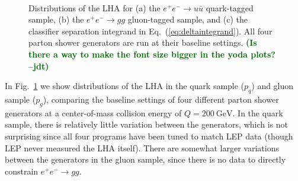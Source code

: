 \documentclass[11pt,letterpaper]{article}
\newcommand{\GeV}{\text{GeV}}
\DeclareRobustCommand{\Fig}[1]{Fig.~\ref{#1}}
\DeclareRobustCommand{\Eq}[1]{Eq.~(\ref{#1})}
\newcommand{\jdt}[1]{\textbf{\textcolor{darkgreen}{(#1 --jdt)}}}
\begin{document}
\begin{figure}
\centering
{}
$\quad$
$\quad$
\caption{Distributions of the LHA for (a) the $e^+ e^- \to u \bar{u}$ quark-tagged sample, (b) the $e^+ e^- \to gg$ gluon-tagged sample, and (c) the classifier separation integrand in \Eq{eq:deltaintegrand}.  All four parton shower generators are run at their baseline settings.  \jdt{Is there a way to make the font size bigger in the yoda plots?}}
\label{fig:LHA_hadron}
\end{figure}


In \Fig{fig:LHA_hadron} we show distributions of the LHA in the quark sample ($p_q$) and gluon sample ($p_g$), comparing the baseline settings of four different parton shower generators at a center-of-mass collision energy of $Q = 200~\GeV$. In the quark sample, there is relatively little variation between the generators, which is not surprising since all four programs have been tuned to match LEP data (though LEP never measured the LHA itself).  There are somewhat larger variations between the generators in the gluon sample, since there is no data to directly constrain $e^+ e^- \to gg$.
\end{document}
